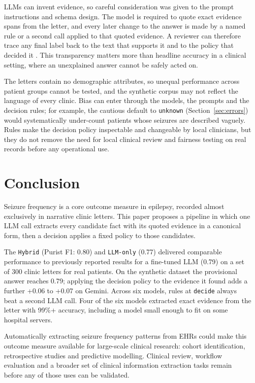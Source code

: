 \documentclass[conference]{IEEEtran}
\begin{document}
LLMs can invent evidence, so careful consideration was given
to the prompt instructions and schema design. The model is
required to quote exact evidence spans from the letter, and 
every later change to the answer is made by a named rule or 
a second call applied to that quoted evidence. A 
reviewer can therefore trace any final label back to the 
text that supports it and to the policy that decided 
it \cite{b14}. This transparency matters more than headline 
accuracy in a clinical setting, where an unexplained answer 
cannot be safely acted on.

The letters contain no demographic attributes, so unequal
performance across patient groups cannot be tested, and the 
synthetic corpus may not reflect the language of every 
clinic. Bias can enter through the models, the prompts and 
the decision rules; for example, the cautious default to 
\texttt{unknown} (Section~\ref{sec:errors}) would 
systematically under-count patients whose seizures are 
described vaguely. Rules make the decision policy 
inspectable and changeable by local clinicians, but they do 
not remove the need for local clinical review and fairness 
testing on real records before any operational use.

\section{Conclusion}

Seizure frequency is a core outcome measure in epilepsy, 
recorded almost exclusively in narrative clinic letters. This 
paper proposes a pipeline in which one LLM call extracts every 
candidate fact with its quoted evidence in a canonical form, then a 
decision applies a fixed policy to those candidates. 

The \texttt{Hybrid} (Purist F1: 0.80) and \texttt{LLM-only} 
(0.77) delivered comparable performance to previously reported 
results for a fine-tuned LLM (0.79) on a set of 300 clinic letters
for real patients. On the synthetic dataset the provisional 
answer reaches 0.79; applying the decision policy to the 
evidence it found adds a further +0.06 to +0.07 on Gemini. 
Across six models, rules at \texttt{decide} always beat a 
second LLM call. Four of the six models extracted exact
evidence from the letter with 99\%+ accuracy, including a 
model small enough to fit on some hospital servers.

Automatically extracting seizure frequency patterns from EHRs 
could make this outcome measure available for large-scale 
clinical research: cohort identification, retrospective 
studies and predictive modelling. Clinical review, 
workflow evaluation and a broader set of clinical information 
extraction tasks remain before any of those uses can be validated.
\end{document}
